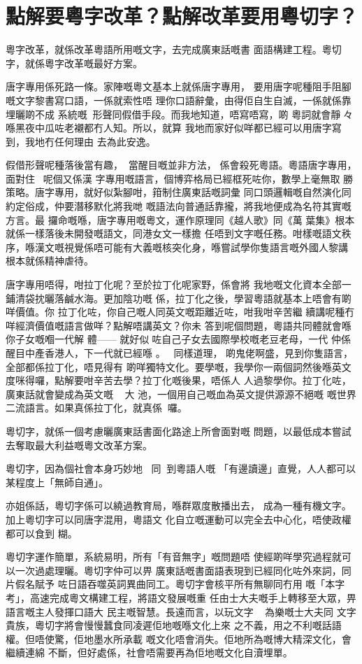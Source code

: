 \section{點解要粵字改革？點解改革要用粵切字？}



粵字改革，就係改革粵語所用嘅文字，去完成廣東話嘅書 面語構建工程。粵切字，就係粵字改革嘅最好方案。

唐字專用係死路一條。家陣嘅粵文基本上就係唐字專用， 要用唐字呢種阻手阻腳嘅文字黎書寫口語，一係就索性唔 理你口語辭彙，由得佢自生自滅，一係就係靠埋曬啲不成 系統嘅形聲同假借手段。而我地知道，唔寫唔寫，啲 粵詞就會靜々喺黑夜中瓜咗老襯都冇人知。所以，就算 我地而家好似咩都已經可以用唐字寫到，我地冇任何理由 去為此安逸。

假借形聲呢種落後當有趣，當醒目嘅並非方法， 係會殺死粵語。粵語唐字專用，面對住呢個又係漢 字專用嘅語言，個博弈格局已經框死咗你，數學上毫無取 勝策略。唐字專用，就好似紮腳咁，箝制住廣東話嘅詞彙 同口頭邏輯嘅自然演化同約定俗成，仲要潛移默化將我哋 嘅語法向普通話靠攏，將我地便成為名符其實嘅方言。最 攞命嘅喺，唐字專用嘅粵文，運作原理同《越人歌》同《萬 葉集》根本就係一樣落後未開發嘅語文，同港女文一樣擔 任唔到文字嘅任務。咁樣嘅語文秩序，喺漢文嘅視覺係唔可能有大義嘅核突化身，喺嘗試學你隻語言嘅外國人黎講 根本就係精神虐待。

唐字專用唔得，咁拉丁化呢？至於拉丁化呢家野，係會將 我地嘅文化資本全部一鋪清袋抌曬落鹹水海。更加陰功嘅 係，拉丁化之後，學習粵語就基本上唔會有啲咩價值。你 拉丁化咗，你自己嘅人同英文嘅距離近咗，咁我咁辛苦繼 續講呢種冇咩經濟價值嘅語言做咩？點解唔講英文？你未 答到呢個問題，粵語共同體就會喺你子女嘅嗰一代解 體—— 就好似咗自己子女去國際學校嘅老豆老母，一代 仲係醒目中產香港人，下一代就已經喺 。同樣道理， 啲鬼佬啊盛，見到你隻語言，全部都係拉丁化，唔見得有 啲咩獨特文化。要學嘅，我學你一兩個詞然後喺英文度咪得囉，點解要咁辛苦去學？拉丁化嘅後果，唔係人 人過黎學你。拉丁化咗，廣東話就會變成為英文嘅 大 池，一個用自己嘅血為英文提供源源不絕嘅 嘅世界 二流語言。如果真係拉丁化，就真係囉。

粵切字，就係一個考慮曬廣東話書面化路途上所會面對嘅 問題，以最低成本嘗試去奪取最大利益嘅粵文改革方案。

粵切字，因為個社會本身巧妙地 同到粵語人嘅 「有邊讀邊」直覺，人人都可以某程度上「無師自通」。

亦姐係話，粵切字係可以繞過教育局，喺群眾度散播出去， 成為一種有機文字。加上粵切字可以同唐字混用，粵語文 化自立嘅運動可以完全去中心化，唔使政權都可以食到 糊。

粵切字運作簡單，系統易明，所有「有音無字」嘅問題唔 使經啲咩學究過程就可以一次過處理曬。粵切字仲可以畀 廣東話嘅書面語表現到已經同化咗外來詞，同片假名賦予 咗日語吞噬英詞異曲同工。粵切字會核平所有無聊同冇用 嘅「本字考」，高速完成粵文構建工程，將語文發展嘅重 任由士大夫嘅手上轉移至大眾，畀語言嘅主人發揮口語大 民主嘅智慧。長遠而言，以玩文字 為樂嘅士大夫同 文字貴族，粵切字將會慢慢蠶食同凌遲佢地嘅喺文化上來 之不義，用之不利嘅話語權。但唔使驚，佢地墨水所承載 嘅文化唔會消失。佢地所為嘅博大精深文化，會繼續連綿 不斷，但好處係，社會唔需要再為佢地嘅文化自瀆埋單。


